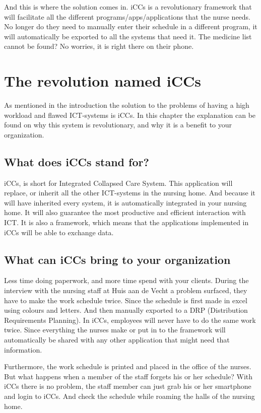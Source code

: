 \documentclass{report}
\begin{document}
And this is where the solution comes in. iCCs is a revolutionary
framework that will facilitate all the different
programs/apps/applications that the nurse needs. No longer do they need
to manually enter their schedule in a different program, it will
automatically be exported to all the systems that need it. The medicine list cannot be found? No worries, it is right there on their phone.

\chapter{The revolution named iCCs}
\thispagestyle{fancy}

As mentioned in the introduction the solution to the problems of having a high workload and flawed ICT-systems is iCCs. In this chapter the explanation can be found on why this system is revolutionary, and why it is a benefit to your organization.

\section{What does iCCs stand for?}

iCCs, is short for Integrated Collapsed Care System. This application will replace, or inherit all the other ICT-systems in the nursing home. And because it will have inherited every system, it is automatically integrated in your nursing home. It will also guarantee the most productive and efficient interaction with ICT. It is also a framework, which means that the applications implemented in iCCs will be able to exchange data.


\section{What can iCCs bring to your organization}

Less time doing paperwork, and more time spend with your clients. During the interview with the nursing staff at Huis aan de Vecht a problem surfaced, they have to make the work schedule twice. Since the schedule is first made in excel using colours and letters. And then manually exported to a DRP (Distribution Requirements Planning). In iCCs, employees will never have to do the same work twice. Since everything the nurses make or put in to the framework will automatically be shared with any other application that might need that information. 

Furthermore, the work schedule is printed and placed in the office of the nurses. But what happens when a member of the staff forgets his or her schedule? With iCCs there is no problem, the staff member can just grab his or her smartphone and login to iCCs. And check the schedule while roaming the halls of the nursing home.
\end{document}
